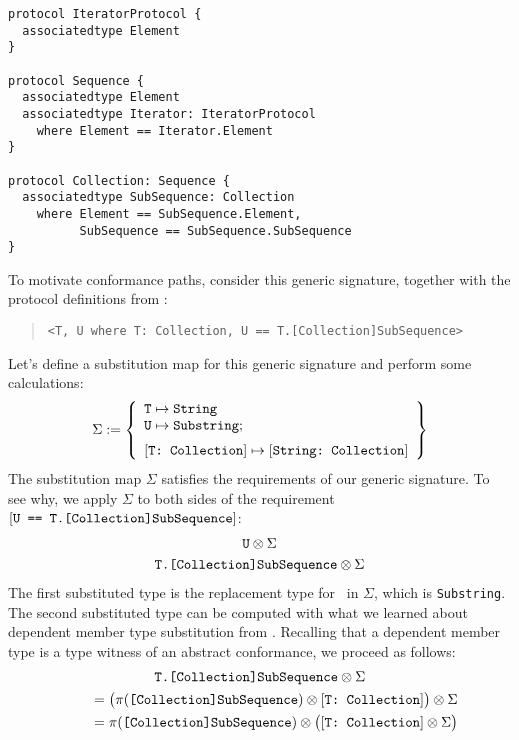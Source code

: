 \documentclass[../generics]{subfiles}
\begin{document}
\begin{listing}\label{conformance paths listing}
\begin{Verbatim}
protocol IteratorProtocol {
  associatedtype Element
}

protocol Sequence {
  associatedtype Element
  associatedtype Iterator: IteratorProtocol
    where Element == Iterator.Element
}

protocol Collection: Sequence {
  associatedtype SubSequence: Collection
    where Element == SubSequence.Element,
          SubSequence == SubSequence.SubSequence
}
\end{Verbatim}
\end{listing}
To motivate conformance paths, consider this generic signature, together with the protocol definitions from :
\begin{quote}
\begin{verbatim}
<T, U where T: Collection, U == T.[Collection]SubSequence>
\end{verbatim}
\end{quote}
Let's define a substitution map for this generic signature and perform some calculations:
\[
\Sigma := \SubstMapLongC{
\SubstType{T}{String}\\
\SubstType{U}{Substring}
}{
\SubstConf{T}{String}{Collection}
}
\]
The substitution map $\Sigma$ satisfies the requirements of our generic signature. To see why, we apply $\Sigma$ to both sides of the requirement $[\texttt{U == T.[Collection]SubSequence}]$:
\begin{gather*}
\texttt{U} \otimes \Sigma\\
\texttt{T.[Collection]SubSequence} \otimes \Sigma
\end{gather*}
The first substituted type is the replacement type for \tU\ in $\Sigma$, which is \texttt{Substring}. The second substituted type can be computed with what we learned about dependent member type substitution from . Recalling that a dependent member type is a type witness of an abstract conformance, we proceed as follows:
\begin{gather*}
\texttt{T.[Collection]SubSequence} \otimes \Sigma\\
\qquad {} = \bigl(\pi(\texttt{[Collection]SubSequence}) \otimes [\texttt{T:~Collection}]\bigr) \otimes \Sigma\\
\qquad {} = \pi(\texttt{[Collection]SubSequence}) \otimes \bigl([\texttt{T:~Collection}] \otimes \Sigma\bigr)
\end{gather*}
\end{document}
